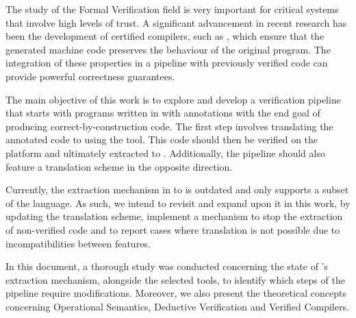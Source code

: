 
%

The study of the Formal Verification field is very important for critical systems that
involve high levels of trust. A significant advancement in recent research has been the
development of certified compilers, such as \cml, which ensure that the generated 
machine code preserves the behaviour of the original program. The integration of these 
properties in a pipeline with previously verified code can provide powerful correctness
guarantees. 

The main objective of this work is to explore and develop a verification pipeline 
that starts with programs written in \ocaml with \gospel annotations with the end goal of
producing correct-by-construction \cml code. The first step involves translating the
annotated \ocaml code to \whyml using the \cameleer tool. This \whyml code should then be 
verified on the \whythree platform and ultimately extracted to \cml. Additionally, the 
pipeline should also feature a translation scheme in the opposite direction.

Currently, the extraction mechanism in \whythree to \cml is outdated and only supports
a subset of the language. As such, we intend to revisit and expand upon it in this 
work, by updating the translation scheme, implement a mechanism to stop the extraction
of non-verified code and to report cases where translation is not possible due to 
incompatibilities between features.

In this document, a thorough study was conducted concerning the state of \whythree's
extraction mechanism, alongside the selected tools, to identify which steps of the 
pipeline require modifications. Moreover, we also present the theoretical 
concepts concerning Operational Semantics, Deductive Verification and Verified 
Compilers.



